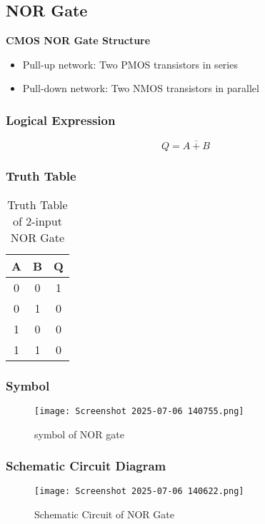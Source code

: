 \documentclass[12pt]{article}
\begin{document}
\subsection{\large{\textbf{NOR Gate}}}
     \textbf{CMOS NOR Gate Structure}
     \begin{itemize}
         \item Pull-up network: Two PMOS transistors in series
        
        \item Pull-down network: Two NMOS transistors in parallel
     \end{itemize}
     \subsubsection{Logical Expression}
     \[
        Q = \overline{A + B}
        \]
    \subsubsection{Truth Table}
        \begin{table}[H]
        \centering
        \caption{Truth Table of 2-input NOR Gate}
        \begin{tabular}{|c|c|c|}
        \hline
        \textbf{A} & \textbf{B} & \textbf{Q} \\
        \hline
        0 & 0 & 1 \\
        0 & 1 & 0 \\
        1 & 0 & 0 \\
        1 & 1 & 0 \\
        \hline
        \end{tabular}
        \end{table}

    \subsubsection{Symbol}
        \begin{figure}[H]
            \centering
            \texttt{[image: Screenshot 2025-07-06 140755.png]}
            \caption{symbol of NOR gate}
            \label{fig:enter-label}
        \end{figure}

    \subsubsection{Schematic Circuit Diagram}

        \begin{figure}[H]
            \centering
            \texttt{[image: Screenshot 2025-07-06 140622.png]} %
            \caption{Schematic Circuit of NOR Gate}
            \label{fig:schematic-nor}
        \end{figure}
\end{document}
